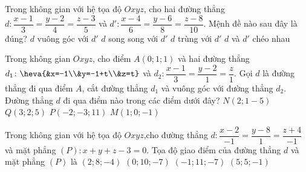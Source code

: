 	\begin{ex}%
	Trong không gian với hệ tọa độ $Oxyz$, cho hai đường thẳng $d: \dfrac{x-1}{3}=\dfrac{y-2}{4}=\dfrac{z-3}{5}$ và $d':\dfrac{x-4}{6}=\dfrac{y-6}{8}=\dfrac{z-8}{10}$. Mệnh đề nào sau đây là đúng?
	\choice 
	{$d$ vuông góc với $d'$}
	{$d$ song song với $d'$}
	{\True $d$ trùng với $d'$}
	{$d$ và $d'$ chéo nhau} 
	\end{ex} 
	\begin{ex}%
	Trong không gian $Oxyz$, cho điểm $A(0;1;1)$ và hai đường thẳng $d_1\colon \heva{&x=-1\\&y=-1+t\\&z=t}$ và $d_2\colon \dfrac{x-1}{3}=\dfrac{y-2}{1}=\dfrac{z}{1}$. Gọi $d$ là đường thẳng đi qua điểm $A$, cắt đường thẳng $d_1$ và vuông góc với đường thẳng $d_2$. Đường thẳng $d$ đi qua điểm nào trong các điểm dưới đây?
	\choice%
	{$N(2;1-5)$}
	{$Q(3;2;5)$}
	{$P(-2;-3;11)$}
	{\True $M(1;0;-1)$}
	\end{ex}
	\begin{ex}%
	Trong không gian với hệ tọa độ $Oxyz$,cho đường thẳng $d\colon \dfrac{x-2}{-1} =\dfrac{y-8}{1} =\dfrac{z+4}{-1}$ và mặt phẳng $(P)\colon x+y+z-3=0$. Tọa độ giao điểm của đường thẳng $d$ và mặt phẳng $(P)$ là
	\choice
	{$(2;8;-4)$}
	{$(0;10;-7)$}
	{\True $(-1;11;-7)$}
	{$(5;5;-1)$}
	\end{ex}
